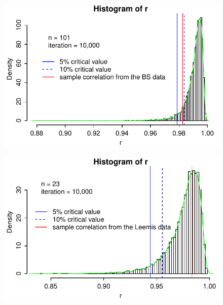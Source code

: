\begin{frame}   %
\begin{figure}[h]
   \includegraphics[width=4.5in]{hist-corr1.pdf} %
   \vspace{-3ex}
\end{figure}
\end{frame}



\begin{frame}   %
\begin{figure}[h]
   \includegraphics[width=4.5in]{hist-corr2.pdf} %
   \vspace{-3ex}
\end{figure}
\end{frame}







